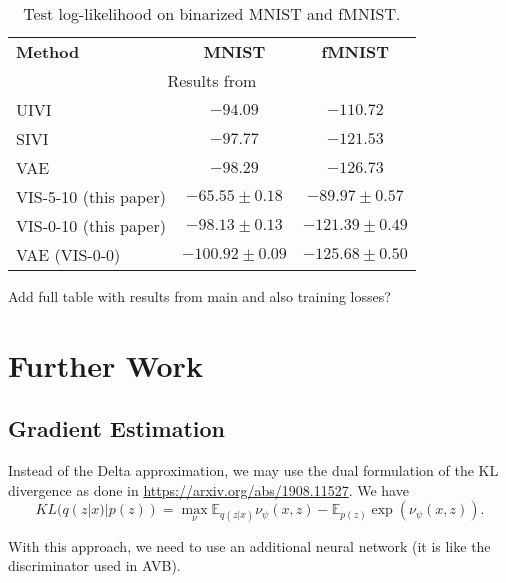 \begin{table}[!ht]
\centering
\caption{Test log-likelihood on binarized MNIST and fMNIST.}\label{tbl:iwhvae}
\begin{tabular}{lcc}
\cline{1-3}
\textbf{Method}   & \textbf{MNIST}                             & \textbf{fMNIST}   \\ \cline{1-3}
\multicolumn{3}{c}{\small Results from \parencite{pmlr-v89-titsias19a}}       \\
    UIVI          & $-94.09$ &  $-110.72$ \\
    SIVI          & $-97.77$ &  $-121.53$ \\
    VAE          & $-98.29$ &  $-126.73$ \\
    \cline{1-3}
    VIS-5-10 (this paper)     & $\bm{-65.55 \pm 0.18}$ & $\bm{-89.97 \pm 0.57}$  \\
    VIS-0-10 (this paper)     & $-98.13 \pm 0.13$ & $-121.39 \pm 0.49$  \\
    VAE (VIS-0-0)              & $-100.92 \pm 0.09$ & $-125.68 \pm 0.50$ \\
\end{tabular}
\end{table}

Add full table with results from main and also training losses?
\fi

\iffalse
\section{Further Work}

\subsection{Gradient Estimation}

Instead of the Delta approximation, we may use the dual formulation of the KL divergence as done in \url{https://arxiv.org/abs/1908.11527}. We have 
$$
KL(q(z|x) | p(z)) = \max_{\nu} \mathbb{E}_{q(z|x)} \nu_{\psi}(x,z) -  \mathbb{E}_{p(z)} \exp (\nu_{\psi}(x,z)).
$$

With this approach, we need to use an additional neural network (it is like the discriminator used in AVB).


